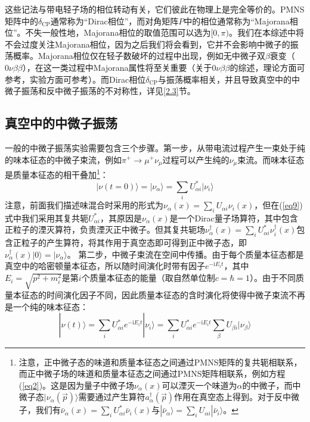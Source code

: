 \documentclass{article}
\newcommand{\ii}{\mathrm{i}}
\begin{document}
	这些记法与带电轻子场的相位转动有关，它们彼此在物理上是完全等价的。PMNS矩阵中的$\delta_\mathrm{CP}$通常称为“Dirac相位”，而对角矩阵$P$中的相位通常称为“Majorana相位”。不失一般性地，Majorana相位的取值范围可以选为$[0,\pi)$。我们在本综述中将不会过度关注Majorana相位，因为之后我们将会看到，它并不会影响中微子的振荡概率。Majorana相位仅在轻子数破坏的过程中出现，例如无中微子双$\beta$衰变（$0\nu\beta\beta$），在这一类过程中Majorana属性将至关重要（关于$0\nu\beta\beta$的综述，理论方面可参考\cite{vergados2012theory}\cite{dell2016neutrinoless}，实验方面可参考\cite{cremonesi2018neutrino}）。而Dirac相位$\delta_\mathrm{CP}$与振荡概率相关，并且导致真空中的中微子振荡和反中微子振荡的不对称性，详见\ref{2.3}节。
	\subsection{真空中的中微子振荡}
	一般的中微子振荡实验需要包含三个步骤。第一步，从带电流过程产生一束处于纯的味本征态的中微子束流，例如$\pi^+\to\mu^+\nu_\mu$过程可以产生纯的$\nu_\mu$束流。而味本征态是质量本征态的相干叠加\footnote{注意，正中微子态的味道和质量本征态之间通过PMNS矩阵的复共轭相联系，而正中微子场的味道和质量本征态之间通过PMNS矩阵相联系，例如方程(\ref{eq2})。这是因为量子中微子场$\nu_\alpha(x)$可以湮灭一个味道为$\alpha$的中微子，而中微子态$|\nu_\alpha(\vec{p})\rangle$需要通过产生算符$a_\alpha^\dagger(\vec{p})$作用在真空态上得到。对于反中微子，我们有$\bar{\nu}_\alpha(x)=\sum_i U_{\alpha i}^*\bar{\nu}_i(x)$与$|\bar{\nu}_\alpha\rangle=\sum_i U_{\alpha i}|\bar{\nu}_i\rangle$。}：
	\begin{equation}
		|\nu(t=0)\rangle=|\nu_\alpha\rangle=\sum_i U_{\alpha i}^*|\nu_i\rangle
		\label{eq9}
	\end{equation}
	注意，前面我们描述味混合时采用的形式为$\nu_{\alpha}(x)=\sum_iU_{\alpha i}\nu_{i}(x)$，但在(\ref{eq9})式中我们采用其复共轭$U_{\alpha i}^*$，其原因是$\nu_\alpha(x)$是一个Dirac量子场算符，其中包含正粒子的湮灭算符，负责湮灭正中微子。但其复共轭场$\nu_\alpha^\dagger(x)=\sum_i U_{\alpha i}^*\nu_i^\dagger(x)$包含正粒子的产生算符，将其作用于真空态即可得到正中微子态，即$\nu_\alpha^\dagger(x)|0\rangle=|\nu_\alpha\rangle$。
	第二步，中微子束流在空间中传播。由于每个质量本征态都是真空中的哈密顿量本征态，所以随时间演化时带有因子$e^{-\ii E_it}$，其中$E_i=\sqrt{p^2+m_i^2}$是第$i$个质量本征态的能量（取自然单位制$c=\hbar=1$）。由于不同质量本征态的时间演化因子不同，因此质量本征态的含时演化将使得中微子束流不再是一个纯的味本征态：
	\begin{equation}
		|\nu(t)\rangle=\sum_{i} U_{\alpha i}^*e^{-\ii E_it}|\nu_i\rangle=\sum_iU_{\alpha i}^*e^{-\ii E_it}\sum_\beta U_{\beta i}|\nu_\beta\rangle
	\end{equation}
\end{document}
